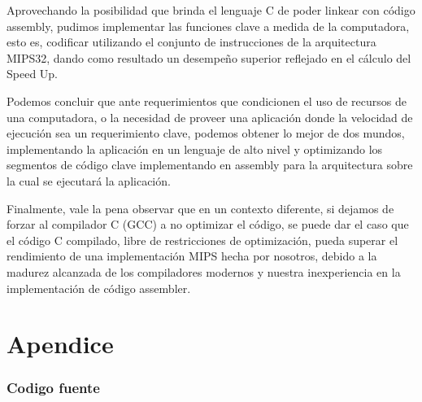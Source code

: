\documentclass{article}
\begin{document}
Aprovechando la posibilidad que brinda el lenguaje C de poder linkear con código assembly, pudimos implementar las funciones clave a medida de la computadora, esto es, codificar utilizando el conjunto de instrucciones de la arquitectura MIPS32, dando como resultado un desempeño superior reflejado en el cálculo del Speed Up.


Podemos concluir que ante requerimientos que condicionen el uso de recursos de una computadora, o la necesidad de proveer una aplicación donde la velocidad de ejecución sea un requerimiento clave, podemos obtener lo mejor de dos mundos, implementando la aplicación en un lenguaje de alto nivel y optimizando los segmentos de código clave implementando en assembly para la arquitectura sobre la cual se ejecutará la aplicación.


Finalmente, vale la pena observar que en un contexto diferente, si dejamos de forzar al compilador C (GCC) a no optimizar el código, se puede dar el caso que el código C compilado, libre de restricciones de optimización, pueda superar el rendimiento de una implementación MIPS hecha por nosotros, debido a la madurez alcanzada de los compiladores modernos y nuestra inexperiencia en la implementación de código assembler.


\clearpage

\part{Apendice}
\appendix


\section{Codigo fuente}\label{sec:source}

%
%
%

\clearpage
\end{document}
